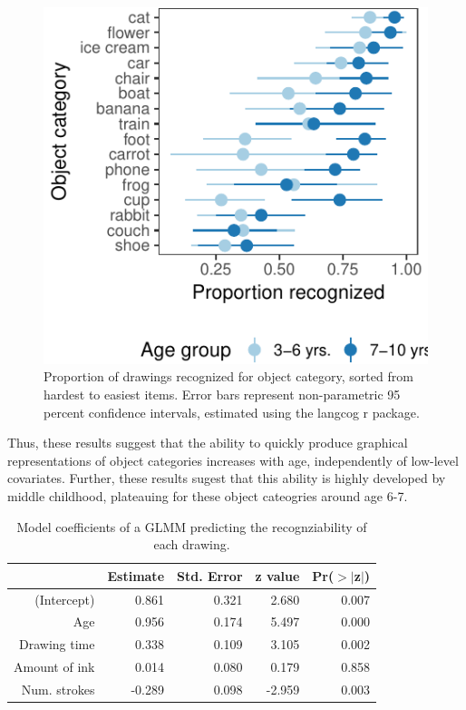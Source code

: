 \documentclass[10pt, letterpaper]{article}
\newenvironment{CodeChunk}{}{}
\begin{document}
\begin{CodeChunk}
\begin{figure}[H]

{\centering \includegraphics{figs/recognizabilityByItem-1} 

}

\caption[Proportion of drawings recognized for object category, sorted from hardest to easiest items]{Proportion of drawings recognized for object category, sorted from hardest to easiest items. Error bars represent non-parametric 95 percent confidence intervals, estimated using the langcog r package.}\label{fig:recognizabilityByItem}
\end{figure}
\end{CodeChunk}

Thus, these results suggest that the ability to quickly produce
graphical representations of object categories increases with age,
independently of low-level covariates. Further, these results sugest
that this ability is highly developed by middle childhood, plateauing
for these object cateogries around age 6-7.

\begin{table}[H]
\centering
\begin{tabular}{rrrrr}
  \hline
 & Estimate & Std. Error & z value & Pr($>$$|$z$|$) \\ 
  \hline
(Intercept) & 0.861 & 0.321 & 2.680 & 0.007 \\ 
  Age & 0.956 & 0.174 & 5.497 & 0.000 \\ 
  Drawing time & 0.338 & 0.109 & 3.105 & 0.002 \\ 
  Amount of ink & 0.014 & 0.080 & 0.179 & 0.858 \\ 
  Num. strokes & -0.289 & 0.098 & -2.959 & 0.003 \\ 
   \hline
\end{tabular}
\caption{Model coefficients of a GLMM predicting the recognziability of each  drawing.} 
\end{table}
\end{document}

